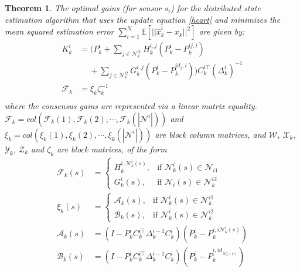 \documentclass[twocolumn]{IEEEtran}
\newtheorem{theorem}{Theorem}
\begin{document}
\begin{theorem}
The optimal gains (for sensor $s_i$) for the distributed state estimation algorithm that uses the update equation \eqref{heart} and minimizes the mean squared estimation error $\sum_{i=1}^N\mathbb{E}[||\hat{x}^i_{k}-x_{k}||^2]$ are given by:
\begin{equation}\label{gains}
\begin{split}
K_{k}^{i}&=(P_{k}^i+\sum_{j \in \mathcal{N}_{k}^{i1}} H_{k}^{i,j}(P_{k}^i - P_{k}^{ij,i})\\
&\quad~+\sum_{j \in \mathcal{N}_{k}^{i2}} G_{k}^{i,j}(P_{k}^i - P_{k}^{id_j,i}))C_{k}^{i\top}({\Delta_{k}^i})^{-1}\\
\mathcal{F}_{k}& =\xi_{k}\zeta_{k}^{-1}\\
\end{split}
\end{equation}
where the consensus gains are represented via a linear matrix equality. $\mathcal{F}_{k}=col(\mathcal{F}_{k}(1),\mathcal{F}_{k}(2),\cdots,\mathcal{F}_{k}(|\mathcal{N}^i|))$ and $\xi_{k}=col(\xi_{k}(1),\xi_{k}(2),\cdots,\xi_{k}(|\mathcal{N}^i|))$ are block column matrices, and $\mathcal{W}$, $\mathcal{X}_{k}$, $\mathcal{Y}_{k}$, $\mathcal{Z}_{k}$ and $\zeta_{k}$ are block matrices, of the form
\begin{equation*}
\begin{split}
\mathcal{F}_{k}(s)& =\left\{\begin{array}{cl}
H_{k}^{i,\mathcal{N}_{k}^{i}(s)}, &\text{if $\mathcal{N}_{k}^{i}(s)\in \mathcal{N}_{i1}$}\\
G_{k}^{i}(s), &\text{if $\mathcal{N}_{i}(s)\in \mathcal{N}_{k}^{i2}$}
\end{array}\right.\\
\xi_{k}(s)&= \left\{\begin{array}{cl}
\mathcal{A}_{k}(s), &\text{if $\mathcal{N}_{k}^{i}(s)\in \mathcal{N}_{k}^{i1}$}\\
\mathcal{B}_{k}(s), &\text{if $\mathcal{N}_{k}^{i}(s)\in \mathcal{N}_{k}^{i2}$}
\end{array}\right.\\
\mathcal{A}_{k}(s)&=(I - P_k^i C_k^{i\top} \Delta_k^{i-1} C_k^i)(P_k^i - P_k^{i,i\mathcal{N}_{k}^{i}(s)})\\
\mathcal{B}_{k}(s)&=(I - P_k^i C_k^{i\top} \Delta_k^{i-1} C_k^i)(P_k^i - P_k^{i,id_{\mathcal{N}_{k}^{i}(s)}})
\end{split}

\end{equation*}
\end{theorem}
\end{document}
